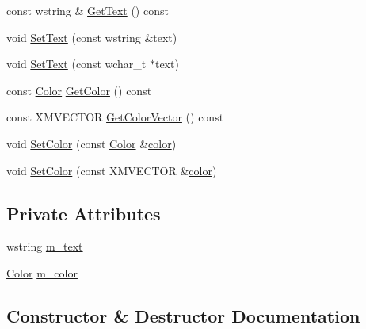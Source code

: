 \begin{DoxyCompactItemize}
\item 
const wstring \& \hyperlink{structmage_1_1_sprite_text_item_a5011cbf5dfb7763caa8b9516be339530}{Get\+Text} () const
\item 
void \hyperlink{structmage_1_1_sprite_text_item_a76da120ec8798b22299d7050e8f05afb}{Set\+Text} (const wstring \&text)
\item 
void \hyperlink{structmage_1_1_sprite_text_item_a702f0a51a8bf08e0d59b770d81bb2bee}{Set\+Text} (const wchar\+\_\+t $\ast$text)
\item 
const \hyperlink{structmage_1_1_color}{Color} \hyperlink{structmage_1_1_sprite_text_item_a5b98c37b46c928bacb5b82d648c0685e}{Get\+Color} () const
\item 
const X\+M\+V\+E\+C\+T\+OR \hyperlink{structmage_1_1_sprite_text_item_aa42efb6fce8dd283ee2bfb16ce459f93}{Get\+Color\+Vector} () const
\item 
void \hyperlink{structmage_1_1_sprite_text_item_ad5440a79f5f08d3fe8d4b58f69a88f3c}{Set\+Color} (const \hyperlink{structmage_1_1_color}{Color} \&\hyperlink{namespacemage_a56eceea5a9bceb2b56073f3ea4945781}{color})
\item 
void \hyperlink{structmage_1_1_sprite_text_item_a534551b3c7a135049984d19318004f82}{Set\+Color} (const X\+M\+V\+E\+C\+T\+OR \&\hyperlink{namespacemage_a56eceea5a9bceb2b56073f3ea4945781}{color})
\end{DoxyCompactItemize}
\subsection*{Private Attributes}
\begin{DoxyCompactItemize}
\item 
wstring \hyperlink{structmage_1_1_sprite_text_item_a027472334af3f1095931d238ea42cd6c}{m\+\_\+text}
\item 
\hyperlink{structmage_1_1_color}{Color} \hyperlink{structmage_1_1_sprite_text_item_a47e7057c6de9f22492b09be6c6f3a932}{m\+\_\+color}
\end{DoxyCompactItemize}


\subsection{Constructor \& Destructor Documentation}
\hypertarget{structmage_1_1_sprite_text_item_a887e1db9520a6d08e77c554a863dfd47}{}\label{structmage_1_1_sprite_text_item_a887e1db9520a6d08e77c554a863dfd47} 
